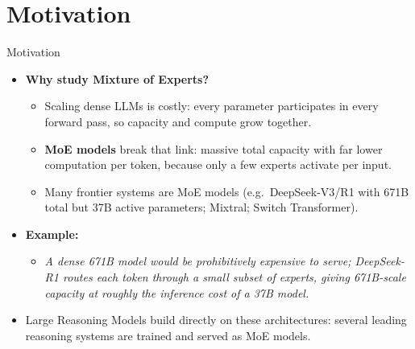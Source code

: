 \section{Motivation}
\begin{frame}{Motivation}
    \begin{itemize}
        \item \textbf{Why study Mixture of Experts?}
        \begin{itemize}
            \item Scaling dense LLMs is costly: every parameter participates in every forward pass, so capacity and compute grow together.
            \item \textbf{MoE models} break that link: massive total capacity with far lower computation per token, because only a few experts activate per input.
            \item Many frontier systems are MoE models (e.g.\ DeepSeek-V3/R1 with 671B total but 37B active parameters; Mixtral; Switch Transformer).
        \end{itemize}
        \item \textbf{Example:}
        \begin{itemize}
            \item \textit{A dense 671B model would be prohibitively expensive to serve; DeepSeek-R1 routes each token through a small subset of experts, giving 671B-scale capacity at roughly the inference cost of a 37B model.}
        \end{itemize}
        \item Large Reasoning Models build directly on these architectures: several leading reasoning systems are trained and served as MoE models.
    \end{itemize}
\end{frame}
